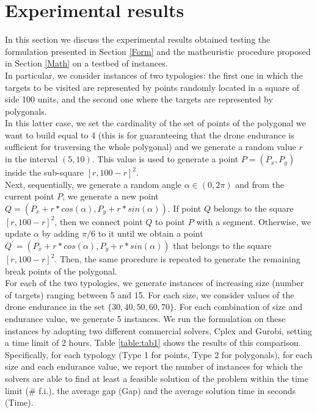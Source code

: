 
\section{Experimental results} \label{results}




In this section we discuss the experimental results obtained testing the formulation presented in Section \ref{Form} and the matheuristic procedure proposed in Section \ref{Math} on a testbed of instances.\\
In particular, we consider instances of two typologies: the first one in which the targets to be visited are represented by points randomly located in a square of side 100 units, and the second one where the targets are represented by polygonals.\\
In this latter case, we set the cardinality of the set of points of the polygonal we want to build equal to 4 (this is for guaranteeing that the drone endurance is sufficient for traversing the whole polygonal) and we generate a random value $r$ in the interval $(5, 10)$. This value is used to generate a point $P=(P_x, P_y)$ inside the sub-square $[r, 100-r]^2$.\\
Next, sequentially, we generate a random angle $\alpha \in (0,2\pi)$ and from the current point $P$, we generate a new point $Q=(P_x+r*cos(\alpha), P_y + r*sin(\alpha))$. If point $Q$ belongs to the square $[r, 100-r]^2$, then we connect point $Q$ to point $P$ with a segment. Otherwise, we update $\alpha$ by adding $\pi/6$ to it until we obtain a point $Q^{'}=(P_x+r*cos(\alpha), P_y + r*sin(\alpha))$ that belongs to the square $[r, 100-r]^2$.
Then, the same procedure is repeated to generate the remaining break points of the polygonal.\\
For each of the two typologies, we generate instances of increasing size (number of targets) ranging between 5 and 15. For each size, we consider values of the drone endurance in the set $\{30,40,50,60,70\}$. For each combination of size and endurance value, we generate 5 instances.
We run the formulation on these instances by adopting two different commercial solvers, Cplex and Gurobi, setting a time limit of 2 hours.
Table \ref{table:tab1} shows the results of this comparison. Specifically, for each typology (Type 1 for points, Type 2 for polygonals), for each size and each endurance value, we report the number of instances for which the solvers are able to find at least a feasible solution of the problem within the time limit (\# f.i.), the average gap (Gap) and the average solution time in seconds (Time).





